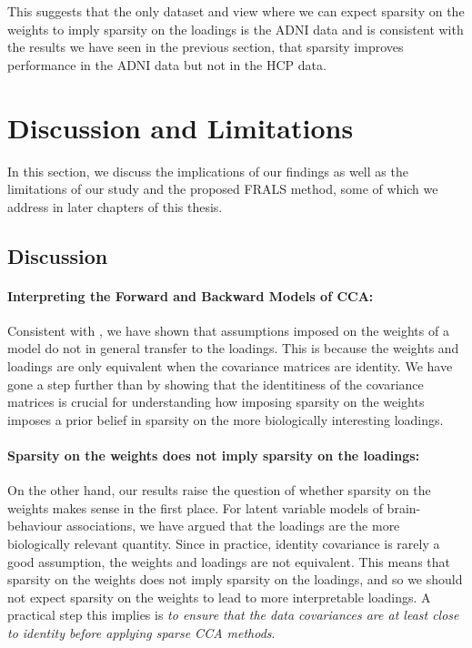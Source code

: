 This suggests that the only dataset and view where we can expect sparsity on the weights to imply sparsity on the loadings is the ADNI data and is consistent with the results we have seen in the previous section, that sparsity improves performance in the ADNI data but not in the HCP data.

\section{Discussion and Limitations}

In this section, we discuss the implications of our findings as well as the limitations of our study and the proposed FRALS method, some of which we address in later chapters of this thesis.

\subsection{Discussion}

\paragraph{Interpreting the Forward and Backward Models of CCA:} Consistent with \cite{haufe2014interpretation}, we have shown that assumptions imposed on the weights of a model do not in general transfer to the loadings.
This is because the weights and loadings are only equivalent when the covariance matrices are identity.
We have gone a step further than \cite{haufe2014interpretation} by showing that the identitiness of the covariance matrices is crucial for understanding how imposing sparsity on the weights imposes a prior belief in sparsity on the more biologically interesting loadings.

\paragraph{Sparsity on the weights does not imply sparsity on the loadings:}

On the other hand, our results raise the question of whether sparsity on the weights makes sense in the first place.
For latent variable models of brain-behaviour associations, we have argued that the loadings are the more biologically relevant quantity.
Since in practice, identity covariance is rarely a good assumption, the weights and loadings are not equivalent.
This means that sparsity on the weights does not imply sparsity on the loadings, and so we should not expect sparsity on the weights to lead to more interpretable loadings.
A practical step this implies is \textit{to ensure that the data covariances are at least close to identity before applying sparse CCA methods}.

